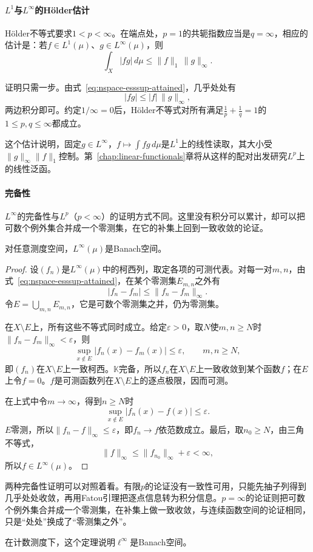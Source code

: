 \paragraph{\texorpdfstring{$L^1$}{L1}与\texorpdfstring{$L^\infty$}{L-infinity}的Hölder估计}
Hölder不等式要求$1<p<\infty$。在端点处，$p=1$的共轭指数应当是$q=\infty$，相应的估计是：若$f\in L^1(\mu)$、$g\in L^\infty(\mu)$，则
\begin{equation}
 \int_X\lvert fg\rvert\,d\mu\leq\lVert f\rVert_1\,\lVert g\rVert_\infty .
 \label{eq:nspace-holder-endpoint}
\end{equation}

证明只需一步。由式~\eqref{eq:nspace-esssup-attained}，几乎处处有
\[
 \lvert fg\rvert\leq\lvert f\rvert\,\lVert g\rVert_\infty,
\]
两边积分即可。约定$1/\infty=0$后，Hölder不等式对所有满足$\tfrac1p+\tfrac1q=1$的$1\leq p,q\leq\infty$都成立。

这个估计说明，固定$g\in L^\infty$，$f\mapsto\int fg\,d\mu$是$L^1$上的线性读取，其大小受$\lVert g\rVert_\infty\lVert f\rVert_1$控制。第~\ref{chap:linear-functionals}章将从这样的配对出发研究$L^p$上的线性泛函。

\paragraph{完备性}
$L^\infty$的完备性与$L^p$（$p<\infty$）的证明方式不同。这里没有积分可以累计，却可以把可数个例外集合并成一个零测集，在它的补集上回到一致收敛的论证。

\begin{theorem}
\label{thm:nspace-linfty-complete}
对任意测度空间，$L^\infty(\mu)$是Banach空间。
\end{theorem}

\begin{proof}
设$(f_n)$是$L^\infty(\mu)$中的柯西列，取定各项的可测代表。对每一对$m,n$，由式~\eqref{eq:nspace-esssup-attained}，在某个零测集$E_{m,n}$之外有
\[
 \lvert f_n-f_m\rvert\leq\lVert f_n-f_m\rVert_\infty.
\]
令$E=\bigcup_{m,n}E_{m,n}$，它是可数个零测集之并，仍为零测集。

在$X\setminus E$上，所有这些不等式同时成立。给定$\varepsilon>0$，取$N$使$m,n\geq N$时$\lVert f_n-f_m\rVert_\infty<\varepsilon$，则
\[
 \sup_{x\notin E}\lvert f_n(x)-f_m(x)\rvert\leq\varepsilon,\qquad m,n\geq N,
\]
即$(f_n)$在$X\setminus E$上一致柯西。$\mathbb K$完备，所以$f_n$在$X\setminus E$上一致收敛到某个函数$f$；在$E$上令$f=0$。$f$是可测函数列在$X\setminus E$上的逐点极限，因而可测。

在上式中令$m\to\infty$，得到$n\geq N$时
\[
 \sup_{x\notin E}\lvert f_n(x)-f(x)\rvert\leq\varepsilon.
\]
$E$零测，所以$\lVert f_n-f\rVert_\infty\leq\varepsilon$，即$f_n\to f$依范数成立。最后，取$n_0\geq N$，由三角不等式，
\[
 \lVert f\rVert_\infty\leq\lVert f_{n_0}\rVert_\infty+\varepsilon<\infty,
\]
所以$f\in L^\infty(\mu)$。
\end{proof}

两种完备性证明可以对照着看。有限$p$的论证没有一致性可用，只能先抽子列得到几乎处处收敛，再用Fatou引理把逐点信息转为积分信息。$p=\infty$的论证则把可数个例外集合并成一个零测集，在补集上做一致收敛，与连续函数空间的论证相同，只是“处处”换成了“零测集之外”。

在计数测度下，这个定理说明$\ell^\infty$是Banach空间。
